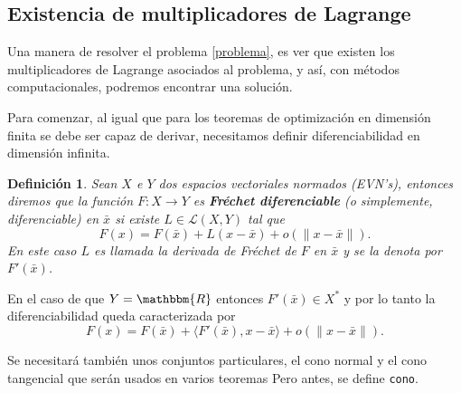 \documentclass[a4paper,10pt]{book}
\newcommand{\R}{\mathbbm{R}}
\newcommand{\arr}{\rightarrow}
\newcommand{\bx}{\bar{x}}
\newcommand{\la}{\langle}
\newcommand{\ra}{\rangle}
\newtheorem{defi}[teo]{Definici\'on}
\begin{document}





\subsection{Existencia de multiplicadores de Lagrange}
Una manera de resolver el problema \eqref{problema}, es ver que existen los multiplicadores de Lagrange asociados al problema, y así, con métodos computacionales, podremos encontrar una solución.

Para comenzar, al igual que para los teoremas de optimización en dimensión finita se debe ser capaz de derivar, necesitamos definir diferenciabilidad en dimensión infinita.
\begin{defi} Sean $X$ e $Y$ dos espacios vectoriales normados (EVN's), entonces diremos que la función $F:X\arr Y$ es \textbf{Fréchet diferenciable} (o simplemente, diferenciable) en $\bx$ si existe $L\in\mathcal{L}(X,Y)$ tal que
$$F(x)=F(\bx)+L(x-\bx)+o(\| x-\bx\|).$$
En este caso $L$ es llamada la derivada de Fréchet de $F$ en $\bx$ y se la denota por $F'(\bx)$.
\end{defi} 
En el caso de que $Y=\R$ entonces $F'(\bx)\in X^*$ y por lo tanto la diferenciabilidad queda caracterizada por
$$F(x)=F(\bx)+\la F'(\bx),x-\bx\ra+o(\|x-\bx\|).$$


 Se necesitará también unos conjuntos particulares,  el cono normal y el cono tangencial que serán usados en varios teoremas Pero antes, se define \texttt{cono}.
\end{document}
